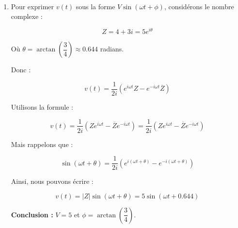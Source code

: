 \documentclass[a4paper,12pt]{article}
\begin{document}
\begin{solutionbox}
\begin{enumerate}
    Pour \( v_2(t) \) :

    \[
    v_2(t) = 4 \sin(\omega t) = \dfrac{4}{2i} \left( e^{i\omega t} - e^{-i\omega t} \right) = \dfrac{2}{i} \left( e^{i\omega t} - e^{-i\omega t} \right)
    \]

    Donc, la somme :

    \[
    v(t) = v_1(t) + v_2(t) = \dfrac{3}{2} \left( e^{i\omega t} + e^{-i\omega t} \right) + \dfrac{2}{i} \left( e^{i\omega t} - e^{-i\omega t} \right)
    \]

    Regroupons :

    \[
    v(t) = \left( \dfrac{3}{2} + \dfrac{2}{i} \right) e^{i\omega t} + \left( \dfrac{3}{2} - \dfrac{2}{i} \right) e^{-i\omega t}
    \]

    Remarquons que \( \dfrac{1}{i} = -i \).

    Donc :

    \[
    \dfrac{2}{i} = -2i
    \]

    Alors :

    \[
    v(t) = \left( \dfrac{3}{2} - 2i \right) e^{i\omega t} + \left( \dfrac{3}{2} + 2i \right) e^{-i\omega t}
    \]

    Multiplions numérateur et dénominateur par 2 pour simplifier les fractions :

    \[
    v(t) = \dfrac{1}{2i} \left( e^{i\omega t} (4 + 3i) - e^{-i\omega t} (4 - 3i) \right)
    \]

    \item Pour exprimer \( v(t) \) sous la forme \( V \sin(\omega t + \phi) \), considérons le nombre complexe :

    \[
    Z = 4 + 3i = 5 e^{i\theta}
    \]

    Où \( \theta = \arctan\left( \dfrac{3}{4} \right) \approx 0.644 \) radians.

    Donc :

    \[
    v(t) = \dfrac{1}{2i} \left( e^{i\omega t} Z - e^{-i\omega t} \overline{Z} \right)
    \]

    Utilisons la formule :

    \[
    v(t) = \dfrac{1}{2i} \left( Z e^{i\omega t} - \overline{Z} e^{-i\omega t} \right) = \dfrac{1}{2i} \left( Z e^{i\omega t} - \overline{Z} e^{-i\omega t} \right)
    \]

    Mais rappelons que :

    \[
    \sin(\omega t + \theta) = \dfrac{1}{2i} \left( e^{i(\omega t + \theta)} - e^{-i(\omega t + \theta)} \right)
    \]

    Ainsi, nous pouvons écrire :

    \[
    v(t) = |Z| \sin(\omega t + \theta) = 5 \sin(\omega t + 0.644)
    \]

    \textbf{Conclusion :} \( V = 5 \) et \( \phi = \arctan\left( \dfrac{3}{4} \right) \).

\end{enumerate}
\end{solutionbox}
\end{document}
